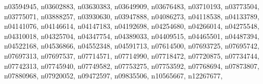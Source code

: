 \documentclass[10pt,twocolumn,letterpaper]{article}
\begin{document}
n03594945, \quad 
n03602883, \quad 
n03630383, \quad 
n03649909, \quad 
n03676483, \quad 
n03710193, \quad 
n03773504, \quad 
n03775071, \quad 
n03888257, \quad 
n03930630, \quad 
n03947888, \quad 
n04086273, \quad 
n04118538, \quad 
n04133789, \quad 
n04141076, \quad 
n04146614, \quad 
n04147183, \quad 
n04192698, \quad 
n04254680, \quad 
n04266014, \quad 
n04275548, \quad 
n04310018, \quad 
n04325704, \quad 
n04347754, \quad 
n04389033, \quad 
n04409515, \quad 
n04465501, \quad 
n04487394, \quad 
n04522168, \quad 
n04536866, \quad 
n04552348, \quad 
n04591713, \quad 
n07614500, \quad 
n07693725, \quad 
n07695742, \quad 
n07697313, \quad 
n07697537, \quad 
n07714571, \quad 
n07714990, \quad 
n07718472, \quad 
n07720875, \quad 
n07734744, \quad 
n07742313, \quad 
n07745940, \quad 
n07749582, \quad 
n07753275, \quad 
n07753592, \quad 
n07768694, \quad 
n07873807, \quad 
n07880968, \quad 
n07920052, \quad 
n09472597, \quad 
n09835506, \quad 
n10565667, \quad 
n12267677, \quad 
\end{document}
